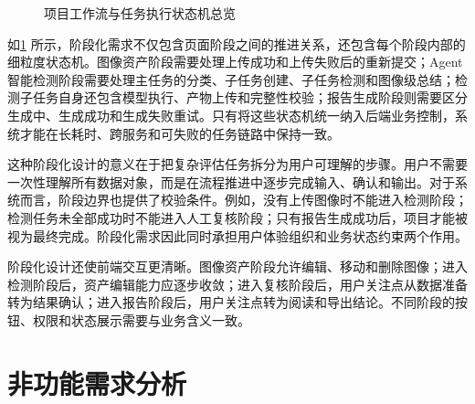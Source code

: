 \begin{figure}[!htb]
{%
  }
  \caption{项目工作流与任务执行状态机总览}\label{fig:requirements-stage-state-machine}
\end{figure}

如\cref{fig:requirements-stage-state-machine} 所示，阶段化需求不仅包含页面阶段之间的推进关系，还包含每个阶段内部的细粒度状态机。图像资产阶段需要处理上传成功和上传失败后的重新提交；Agent 智能检测阶段需要处理主任务的分类、子任务创建、子任务检测和图像级总结；检测子任务自身还包含模型执行、产物上传和完整性校验；报告生成阶段则需要区分生成中、生成成功和生成失败重试。只有将这些状态机统一纳入后端业务控制，系统才能在长耗时、跨服务和可失败的任务链路中保持一致。

这种阶段化设计的意义在于把复杂评估任务拆分为用户可理解的步骤。用户不需要一次性理解所有数据对象，而是在流程推进中逐步完成输入、确认和输出。对于系统而言，阶段边界也提供了校验条件。例如，没有上传图像时不能进入检测阶段；检测任务未全部成功时不能进入人工复核阶段；只有报告生成成功后，项目才能被视为最终完成。阶段化需求因此同时承担用户体验组织和业务状态约束两个作用。

阶段化设计还使前端交互更清晰。图像资产阶段允许编辑、移动和删除图像；进入检测阶段后，资产编辑能力应逐步收敛；进入复核阶段后，用户关注点从数据准备转为结果确认；进入报告阶段后，用户关注点转为阅读和导出结论。不同阶段的按钮、权限和状态展示需要与业务含义一致。

\section{非功能需求分析}
\label{sec:requirements-nonfunctional-requirement-analysis}

